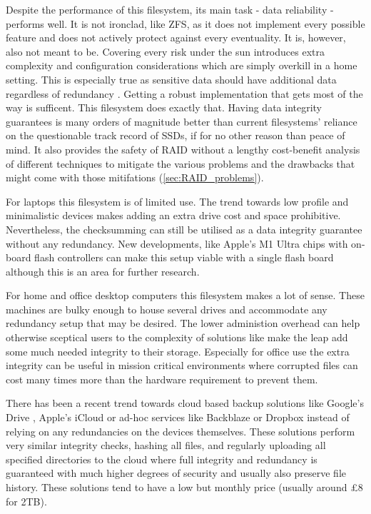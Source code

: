 
        Despite the performance of this filesystem, its main task - data
        reliability - performs well. It is not ironclad, like ZFS, as it does
        not implement every possible feature and does not actively protect
        against every eventuality. It is, however, also not meant to be.
        Covering every risk under the sun introduces extra complexity and
        configuration considerations which are simply overkill in a home
        setting. This is especially true as sensitive data should have
        additional data regardless of redundancy \cite{Backblaze_321}. Getting
        a robust implementation that gets most of the way is sufficent. This
        filesystem does exactly that. Having data integrity guarantees is many
        orders of magnitude better than current filesystems' reliance on the
        questionable track record of SSDs, if for no other reason than peace of
        mind. It also provides the safety of RAID without a lengthy
        cost-benefit analysis of different techniques to mitigate the various
        problems and the drawbacks that might come with those mitifations
        (\autoref{sec:RAID_problems}).

        For laptops this filesystem is of limited use. The trend towards low
        profile and minimalistic devices makes adding an extra drive cost and
        space prohibitive. Nevertheless, the checksumming can still be utilised
        as a data integrity guarantee without any redundancy. New developments,
        like Apple's M1 Ultra chips with on-board flash controllers
        \cite{m1_ultra_controller} can make this setup viable with a single
        flash board although this is an area for further research.

        For home and office desktop computers this filesystem makes a lot of
        sense. These machines are bulky enough to house several drives and
        accommodate any redundancy setup that may be desired. The lower
        administion overhead can help otherwise sceptical users to the
        complexity of solutions like  make the leap add some
        much needed integrity to their storage. Especially for office use the
        extra integrity can be useful in mission critical environments where
        corrupted files can cost many times more than the hardware requirement
        to prevent them.

        There has been a recent trend towards cloud based backup solutions like
        Google's Drive \cite{gdrive}, Apple's iCloud \cite{icloud} or ad-hoc
        services like Backblaze \cite{Backblaze_321} or Dropbox \cite{dropbox}
        instead of relying on any redundancies on the devices themselves. These
        solutions perform very similar integrity checks, hashing all files, and
        regularly uploading all specified directories to the cloud where full
        integrity and redundancy is guaranteed \cite{Backblaze_arch} with much
        higher degrees of security and usually also preserve file history.
        These solutions tend to have a low but monthly price (usually around
        £8 for 2TB).

